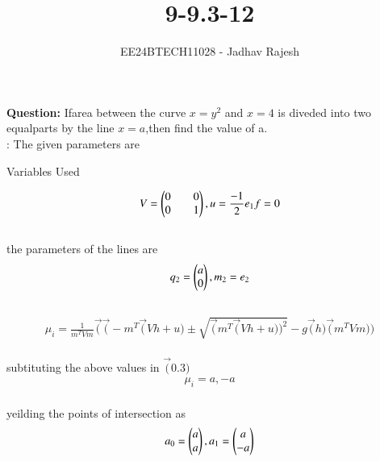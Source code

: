 \documentclass[journal]{IEEEtran}
\begin{document}

\vspace{3cm}
\title{9-9.3-12}
\author{EE24BTECH11028 - Jadhav Rajesh}
{\let\newpage\relax\maketitle}

\renewcommand{\thefigure}{\theenumi}
\renewcommand{\thetable}{\theenumi}
\setlength{\intextsep}{10pt} %


\renewcommand{\thetable}{\theenumi}
 \textbf{Question:} Ifarea between the curve $x=y^{2}$ and $x=4$ is diveded into two equalparts by the line $x=a$,then find the value of a.\\
 \solution : The given parameters are
 \begin{table}[h!]    
  \centering
  
  \caption{Variables Used}
  \label{tab1-1.2-20}
\end{table}
 \begin{align}
               V=\begin{pmatrix}0 && 0\\
                        0 && 1\end{pmatrix},u=\frac{-1}{2}e_{1}f=0
  \end{align}\\
  the parameters of the lines are\\
  \begin{align}
                   q_{2}=\begin{pmatrix}
                                 a\\
                                 0
                   \end{pmatrix},m_{2}=e_{2}
  \end{align}\\
  \begin{align}
                \mu_{i}=\frac{1}{m^{T}Vm}\vec(\vec(-m^{T}\vec(Vh+u)\pm\sqrt{\vec(m^{T}\vec(Vh+u))^{2}}-g\vec(h)\vec(m^{T}Vm))
  \end{align}\\
  subtituting the above values in $\vec(0.3)$
  \begin{align}
                \mu_{i}=a,-a
  \end{align}\\
  yeilding the points of intersection as\\
  \begin{align}
                  a_{0}=\begin{pmatrix}
                               a\\
                               a\end{pmatrix},a_{1}=\begin{pmatrix}
                                                a\\
                                                -a\end{pmatrix}
  \end{align}\\
\end{document}
